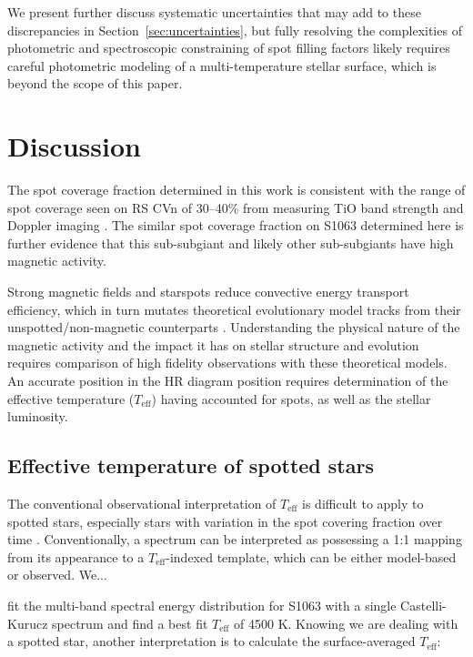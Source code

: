\documentclass[modern,trackchanges]{aastex631}
\begin{document}
We present further discuss systematic uncertainties that may add to these discrepancies in Section~\ref{sec:uncertainties}, but fully resolving the complexities of photometric and spectroscopic constraining of spot filling factors likely requires careful photometric modeling of a multi-temperature stellar surface, which is beyond the scope of this paper. 


\section{Discussion}
\label{sec:discussion}

The spot coverage fraction determined in this work is consistent with the range of spot coverage seen on RS CVn of 30--40\% from measuring TiO band strength \citep{oneal96, oneal98, oneal04} and Doppler imaging \citep{hackman12}. The similar spot coverage fraction on S1063 determined here is further evidence that this sub-subgiant and likely other sub-subgiants have high magnetic activity.

Strong magnetic fields and starspots reduce convective energy transport efficiency, which in turn mutates theoretical evolutionary model tracks from their unspotted/non-magnetic counterparts \citep{2013ApJ...779..183F,somers15,somers15b,somers20}. Understanding the physical nature of the magnetic activity and the impact it has on stellar structure and evolution requires comparison of high fidelity observations with these theoretical models.  An accurate position in the HR diagram position requires determination of the effective temperature ($T_{\textrm{eff}}$) having accounted for spots, as well as the stellar luminosity.

\subsection{Effective temperature of spotted stars}
The conventional observational interpretation of $T_{\textrm{eff}}$ is difficult to apply to spotted stars, especially stars with variation in the spot covering fraction over time \citep{gullysantiago17}.  Conventionally, a spectrum can be interpreted as possessing a 1:1 mapping from its appearance to a $T_{\textrm{eff}}$-indexed template, which can be either model-based or observed.  We...

\citet{leiner17} fit the multi-band spectral energy distribution for S1063 with a single Castelli-Kurucz spectrum \citep{2003IAUS..210P.A20C} and find a best fit $T_{\textrm{eff}}$ of 4500 K. Knowing we are dealing with a spotted star, another interpretation is to calculate the surface-averaged $T_{\textrm{eff}}$:
\end{document}
